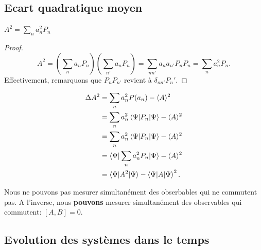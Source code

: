 \documentclass[../notesdecours.tex]{subfiles}
\begin{document}
\subsection{Ecart quadratique moyen}
\begin{lemma}
$A^2 = \sum_n a_n^2P_n$
\end{lemma}
\begin{proof}
\begin{equation*}
A^2 = (\sum_n a_nP_n)(\sum_{n'} a_nP_n) = \sum_{nn'} a_na_{n'}P_nP_{n} = \sum_n a_n^2P_n.
\end{equation*}
Effectivement, remarquons que $P_nP_{n'}$ revient à $\delta_{nn'}P_n'$.
\end{proof}
\begin{align*}
\Delta A^2 &= \sum_n a_n^2 P(a_n) - \langle A\rangle^2\\
&= \sum_n a_n^2 \braket{\Psi|P_n|\Psi} - \langle A\rangle^2\\
&= \sum_n a_n^2 \braket{\Psi|P_n|\Psi} - \langle A\rangle^2\\
&= \braket{\Psi|\sum_n a_n^2 P_n|\Psi} - \langle A\rangle^2\\
&= \braket{\Psi|A^2|\Psi} - \braket{\Psi|A|\Psi}^2.
\end{align*}

\begin{remark} Nous ne pouvons pas mesurer simultanément des obserbables qui ne commutent pas. A l'inverse, nous \textbf{pouvons} mesurer simultanément des observables qui commutent: $[A,B] = 0$. \end{remark}

\subsection{Evolution des systèmes dans le temps}
\begin{center}
\end{center}
\end{document}
